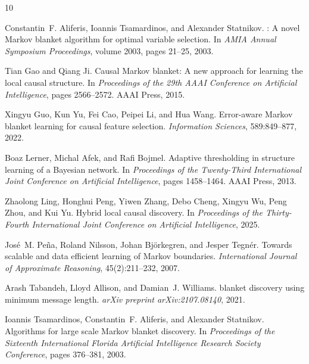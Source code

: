 \documentclass{article}
\theoremstyle{plain}
\theoremstyle{definition}
\begin{document}

\begin{thebibliography}{10}

Constantin~F. Aliferis, Ioannis Tsamardinos, and Alexander Statnikov.
: A novel {Markov} blanket algorithm for optimal variable
  selection.
\newblock In \emph{AMIA Annual Symposium Proceedings}, volume 2003, pages
  21--25, 2003.

Tian Gao and Qiang Ji.
\newblock Causal {Markov} blanket: A new approach for learning the local causal
  structure.
\newblock In \emph{Proceedings of the 29th AAAI Conference on Artificial
  Intelligence}, pages 2566--2572. AAAI Press, 2015.

Xingyu Guo, Kun Yu, Fei Cao, Peipei Li, and Hua Wang.
\newblock Error-aware {Markov} blanket learning for causal feature selection.
\newblock \emph{Information Sciences}, 589:849--877, 2022.

Boaz Lerner, Michal Afek, and Rafi Bojmel.
\newblock Adaptive thresholding in structure learning of a {Bayesian} network.
\newblock In \emph{Proceedings of the Twenty-Third International Joint
  Conference on Artificial Intelligence}, pages 1458--1464. AAAI Press, 2013.

Zhaolong Ling, Honghui Peng, Yiwen Zhang, Debo Cheng, Xingyu Wu, Peng Zhou, and
  Kui Yu.
\newblock Hybrid local causal discovery.
\newblock In \emph{Proceedings of the Thirty-Fourth International Joint
  Conference on Artificial Intelligence}, 2025.

Jos{\'e}~M. Pe{\~n}a, Roland Nilsson, Johan Bj{\"o}rkegren, and Jesper
  Tegn{\'e}r.
\newblock Towards scalable and data efficient learning of {Markov} boundaries.
\newblock \emph{International Journal of Approximate Reasoning}, 45(2):211--232,
  2007.

Arash Tabandeh, Lloyd Allison, and Damian~J. Williams.
 blanket discovery using minimum message length.
\newblock \emph{arXiv preprint arXiv:2107.08140}, 2021.

Ioannis Tsamardinos, Constantin~F. Aliferis, and Alexander Statnikov.
\newblock Algorithms for large scale {Markov} blanket discovery.
\newblock In \emph{Proceedings of the Sixteenth International Florida Artificial
  Intelligence Research Society Conference}, pages 376--381, 2003.

\end{thebibliography}
\end{document}
